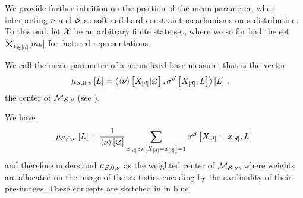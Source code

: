 
We provide further intuition on the position of the mean parameter, when interpreting $\nu$ and $\mathcal{S}$ as soft and hard constraint meachanisms on a distribution.
To this end, let $\mathcal{X}$ be an arbitrary finite state set, where we so far had the set $\bigtimes_{k\in[d]}[m_{k}]$ for factored representations.

\begin{definition}
    We call the mean parameter of a normalized base measure, that is the vector
    \begin{align*}
        \mu_{\mathcal{S},0,\nu}\left[L\right]
        &= \left\langle \left\langle \nu\right\rangle \left[ X_{[d]} | \varnothing \right],\sigma^{\mathcal{S}}\left[X_{[d]},L\right]\right\rangle \left[ L \right] \, .
    \end{align*}
    the center of $\mathcal{M}_{\mathcal{S},\nu}$ (see ).
\end{definition}

We have
\begin{align*}
    \mu_{\mathcal{S},0,\nu}\left[L\right] = \frac{1}{\left\langle \nu\right\rangle \left[ \varnothing \right]} \sum_{x_{[d]}\,:\,\nu\left[X_{[d]}=x_{[d]}\right]=1}  \sigma^{\mathcal{S}}\left[X_{[d]}=x_{[d]},L\right]
\end{align*}
and therefore understand $\mu_{\mathcal{S},0,\nu}$ as the weighted center of $\mathcal{M}_{\mathcal{S},\nu}$, where weights are allocated on the image of the statistics encoding by the cardinality of their pre-images.
These concepts are sketched in  in blue.


